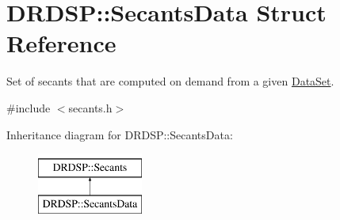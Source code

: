\hypertarget{struct_d_r_d_s_p_1_1_secants_data}{\section{D\-R\-D\-S\-P\-:\-:Secants\-Data Struct Reference}
\label{struct_d_r_d_s_p_1_1_secants_data}
}


Set of secants that are computed on demand from a given \hyperlink{struct_d_r_d_s_p_1_1_data_set}{Data\-Set}.  




{\ttfamily \#include $<$secants.\-h$>$}

Inheritance diagram for D\-R\-D\-S\-P\-:\-:Secants\-Data\-:\begin{figure}[H]
\begin{center}
\leavevmode
\includegraphics[height=2.000000cm]{struct_d_r_d_s_p_1_1_secants_data}
\end{center}
\end{figure}
